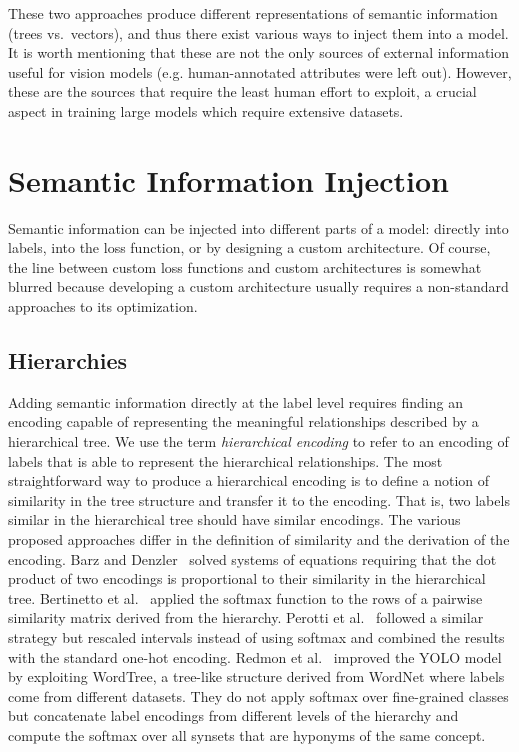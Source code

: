 These two approaches produce different representations of semantic information (trees vs.\ vectors), and thus there exist various ways to inject them into a model.
It is worth mentioning that these are not the only sources of external information useful for vision models (e.g. human-annotated attributes were left out). However, these are the sources that require the least human effort to exploit, a crucial aspect in training large models which require extensive datasets.

\section{Semantic Information Injection}
\label{sec:semantic-information-injection}

Semantic information can be injected into different parts of a model: directly into labels, into the loss function, or by designing a custom architecture. Of course, the line between custom loss functions and custom architectures is somewhat blurred because developing a custom architecture usually requires a non-standard approaches to its optimization.

\subsection{Hierarchies}
\label{subsec:hierarchies}

Adding semantic information directly at the label level requires finding an encoding capable of representing the meaningful relationships described by a hierarchical tree. We use the term \emph{hierarchical encoding} to refer to an encoding of labels that is able to represent the hierarchical relationships. The most straightforward way to produce a hierarchical encoding is to define a notion of similarity in the tree structure and transfer it to the encoding. That is, two labels similar in the hierarchical tree should have similar encodings. The various proposed approaches differ in the definition of similarity and the derivation of the encoding. 
Barz and Denzler~\cite{HierarchyBasedBarz2018} solved systems of equations requiring that the dot product of two encodings is proportional to their similarity in the hierarchical tree.
Bertinetto et al.~\cite{MakingBetterMBertin2019} applied the softmax function to the rows of a pairwise similarity matrix derived from the hierarchy.
Perotti et al.~\cite{BeyondOneHotPerott2023} followed a similar strategy but rescaled intervals instead of using softmax and combined the results with the standard one-hot encoding. 
Redmon et al.~\cite{Yolo9000BetteRedmon2016} improved the YOLO model~\cite{YouOnlyLookORedmon2015} by exploiting WordTree, a tree-like structure derived from WordNet where labels come from different datasets. They do not apply softmax over fine-grained classes but concatenate label encodings from different levels of the hierarchy and compute the softmax over all synsets that are hyponyms of the same concept.


